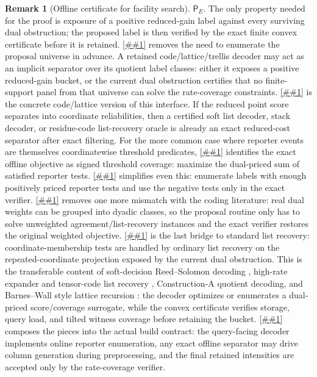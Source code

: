 \documentclass[10pt]{article}
\newcommand{\cref}[1]{\ref{##1}}
\newcommand{\Cref}[1]{\ref{##1}}
\theoremstyle{definition}
\newtheorem{remark}[theorem]{Remark}
\begin{document}
\begin{remark}[Offline certificate for facility search]
   \(\mathsf P_E\).  The only property needed for the proof is exposure of a
   positive reduced-gain label against every surviving dual obstruction; the
   proposed label is then verified by the exact finite convex certificate
   before it is retained.  \Cref{lem:implicit-reduced-gain-separation} removes
   the need to enumerate the proposal universe in advance.  A retained
   code/lattice/trellis decoder may act as an implicit separator over its
   quotient label classes: either it exposes a positive reduced-gain bucket, or
   the current dual obstruction certifies that no finite-support panel from that
   universe can solve the rate-coverage constraints.
   \Cref{cor:soft-list-decoding-reduced-cost-separator} is the concrete
   code/lattice version of this interface.  If the reduced point score separates
   into coordinate reliabilities, then a certified soft list decoder, stack
   decoder, or residue-code list-recovery oracle is already an exact
   reduced-cost separator after exact filtering.  For the more common case
   where reporter events are themselves coordinatewise threshold predicates,
   \cref{cor:threshold-event-reduced-cost} identifies the exact offline
   objective as signed threshold coverage: maximize the dual-priced sum of
   satisfied reporter tests.  \Cref{cor:positive-coverage-screen} simplifies
   even this: enumerate labels with enough positively priced reporter tests and
   use the negative tests only in the exact verifier.
   \Cref{cor:dyadic-positive-list-recovery} removes one more mismatch with the
   coding literature: real dual weights can be grouped into dyadic classes, so
   the proposal routine only has to solve unweighted agreement/list-recovery
   instances and the exact verifier restores the original weighted objective.
   \Cref{cor:ordinary-list-recovery-positive-coverage} is the last bridge to
   standard list recovery: coordinate-membership tests are handled by ordinary
   list recovery on the repeated-coordinate projection exposed by the current
   dual obstruction.
   This is the transferable content of soft-decision Reed--Solomon decoding
   \cite{KV03}, high-rate expander and tensor-code list recovery
   \cite{HW15,HRW17,ST25}, Construction-A quotient decoding, and
   Barnes--Wall style lattice recursion \cite{GP17,MP20}: the decoder optimizes
   or enumerates a dual-priced score/coverage surrogate, while the convex
   certificate verifies storage, query load, and tilted witness coverage before
   retaining the bucket.
   \Cref{cor:unified-soft-decoded-rate-coverage} composes the
   pieces into the actual build contract: the query-facing decoder implements
   online reporter enumeration, any exact offline separator may drive column
   generation during preprocessing, and the final retained intensities are
   accepted only by the rate-coverage verifier.
\end{remark}
\end{document}
